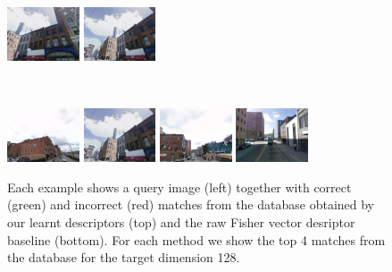 \documentclass[table]{article} %
\begin{document}
\begin{figure}
\begin{minipage}{0.75\linewidth}
\begin{minipage}{\linewidth}
                \colorbox{myGreen}{\includegraphics[height=16mm]{imgs/ex4/FVsvm5}}
                \colorbox{myGreen}{\includegraphics[height=16mm]{imgs/ex4/FVsvm4}}
            \end{minipage}
            \\
            \begin{minipage}{\linewidth}
                \colorbox{myRed}{\includegraphics[height=16mm]{imgs/ex4/FV1}}
                \colorbox{myGreen}{\includegraphics[height=16mm]{imgs/ex4/FV2}}
                \colorbox{myRed}{\includegraphics[height=16mm]{imgs/ex4/FV3}}
                \colorbox{myRed}{\includegraphics[height=16mm]{imgs/ex4/FV4}}
            \end{minipage} 
        \end{minipage}
        \caption{
            Each example shows a query image (left) together with correct (green) and incorrect (red) matches from the database obtained by our learnt descriptors (top) and the raw Fisher vector desriptor baseline (bottom). For each method we show the top 4 matches from the database for the target dimension 128.        
        }
        \label{fig:images}
    \end{figure}
\end{document}
